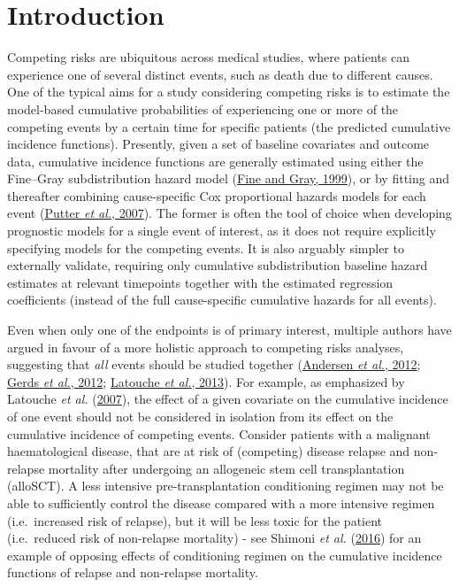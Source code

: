 \documentclass[
  letterpaper,
  DIV=11,
  numbers=noendperiod]{scrreprt}
\begin{document}
\hfill\break

\hypertarget{introduction-3}{%
\section{Introduction}\label{introduction-3}}

Competing risks are ubiquitous across medical studies, where patients
can experience one of several distinct events, such as death due to
different causes. One of the typical aims for a study considering
competing risks is to estimate the model-based cumulative probabilities
of experiencing one or more of the competing events by a certain time
for specific patients (the predicted cumulative incidence functions).
Presently, given a set of baseline covariates and outcome data,
cumulative incidence functions are generally estimated using either the
Fine--Gray subdistribution hazard model
(\protect\hyperlink{ref-fineProportionalHazardsModel1999}{Fine and Gray,
1999}), or by fitting and thereafter combining cause-specific Cox
proportional hazards models for each event
(\protect\hyperlink{ref-putterTutorialBiostatisticsCompeting2007}{Putter
\emph{et al.}, 2007}). The former is often the tool of choice when
developing prognostic models for a single event of interest, as it does
not require explicitly specifying models for the competing events. It is
also arguably simpler to externally validate, requiring only cumulative
subdistribution baseline hazard estimates at relevant timepoints
together with the estimated regression coefficients (instead of the full
cause-specific cumulative hazards for all events).

Even when only one of the endpoints is of primary interest, multiple
authors have argued in favour of a more holistic approach to competing
risks analyses, suggesting that \emph{all} events should be studied
together
(\protect\hyperlink{ref-andersenCompetingRisksEpidemiology2012}{Andersen
\emph{et al.}, 2012};
\protect\hyperlink{ref-gerdsAbsoluteRiskRegression2012a}{Gerds \emph{et
al.}, 2012};
\protect\hyperlink{ref-latoucheCompetingRisksAnalysis2013}{Latouche
\emph{et al.}, 2013}). For example, as emphasized by Latouche \emph{et
al.}
(\protect\hyperlink{ref-latoucheMisspecifiedRegressionModel2007}{2007}),
the effect of a given covariate on the cumulative incidence of one event
should not be considered in isolation from its effect on the cumulative
incidence of competing events. Consider patients with a malignant
haematological disease, that are at risk of (competing) disease relapse
and non-relapse mortality after undergoing an allogeneic stem cell
transplantation (alloSCT). A less intensive pre-transplantation
conditioning regimen may not be able to sufficiently control the disease
compared with a more intensive regimen (i.e.~increased risk of relapse),
but it will be less toxic for the patient (i.e.~reduced risk of
non-relapse mortality) - see Shimoni \emph{et al.}
(\protect\hyperlink{ref-shimoniLongtermSurvivalLate2016}{2016}) for an
example of opposing effects of conditioning regimen on the cumulative
incidence functions of relapse and non-relapse mortality.
\end{document}
